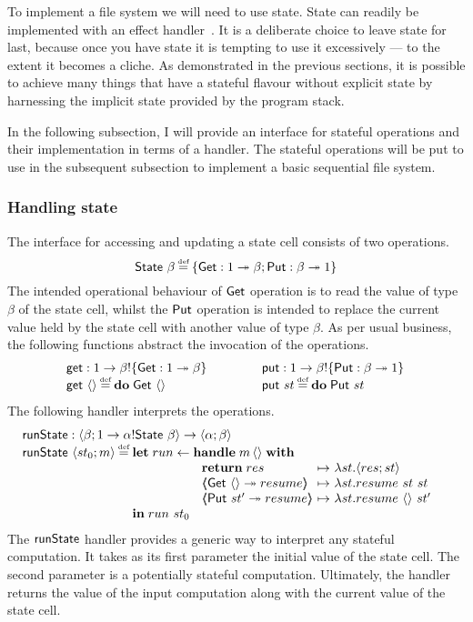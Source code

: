 \documentclass[12pt,phd,lfcs,twoside,openright,logo,leftchapter,normalheadings]{infthesis}
\theoremstyle{plain}
\theoremstyle{definition}
\begin{document}
To implement a file system we will need to use state. State can
readily be implemented with an effect handler~\cite{KammarLO13}.
%
It is a deliberate choice to leave state for last, because once you
have state it is tempting to use it excessively --- to the extent it
becomes a cliche.
%
As demonstrated in the previous sections, it is possible to achieve
many things that have a stateful flavour without explicit state by
harnessing the implicit state provided by the program stack.

In the following subsection, I will provide an interface for stateful
operations and their implementation in terms of a handler. The
stateful operations will be put to use in the subsequent subsection to
implement a basic sequential file system.

\subsubsection{Handling state}

The interface for accessing and updating a state cell consists of two
operations.
%
\[
  \State~\beta \defas \{\Get:\UnitType \opto \beta;\Put:\beta \opto \UnitType\}
\]
%
The intended operational behaviour of $\mathsf{Get}$ operation is to read the
value of type $\beta$ of the state cell, whilst the $\mathsf{Put}$ operation
is intended to replace the current value held by the state cell with
another value of type $\beta$. As per usual business, the following
functions abstract the invocation of the operations.
%
\[
  \ba{@{~}l@{\quad\qquad\quad}c@{~}l}
    \Uget : \UnitType \to \beta \eff \{\Get:\UnitType \opto \beta\}
    & &
    \Uput : \UnitType \to \beta \eff \{\Put:\beta \opto \UnitType\}\\
    \Uget~\Unit \defas \Do\;\Get~\Unit
    & &
    \Uput~st \defas \Do\;\Put~st
  \el
\]
%
The following handler interprets the operations.
%
\[
  \bl
    \runState : \Record{\beta;\UnitType \to \alpha \eff \State~\beta} \to \Record{\alpha;\beta}\\
    \runState~\Record{st_0;m} \defas
        \ba[t]{@{}l}
           \Let\;run \revto
              \ba[t]{@{}l}
                \Handle\;m\,\Unit\;\With\\
                 ~\ba{@{~}l@{~}c@{~}l}
                   \Return\;res      &\mapsto& \lambda st.\Record{res;st}\\
                   \OpCase{\Get}{\Unit}{resume} &\mapsto& \lambda st.resume~st~st\\
                   \OpCase{\Put}{st'}{resume}   &\mapsto& \lambda st.resume~\Unit~st'
                  \ea
              \ea\\
           \In\;run~st_0
        \ea
  \el
\]
%
The $\mathsf{runState}$ handler provides a generic way to interpret any
stateful computation. It takes as its first parameter the initial
value of the state cell. The second parameter is a potentially
stateful computation. Ultimately, the handler returns the value of the
input computation along with the current value of the state cell.
\end{document}
